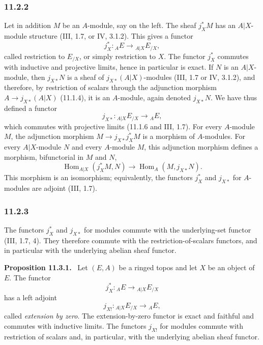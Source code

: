 \documentclass[11pt]{article}
\newcommand{\Hom}{\operatorname{Hom}}
\newenvironment{statement}[1]{\par\medskip\noindent\textbf{#1.}\ }{\par\medskip}
\begin{document}
\subsubsection*{11.2.2}
Let in addition $M$ be an $A$-module, say on the left. The sheaf $j_X^*M$ has an $A|X$-module structure (III, 1.7, or IV, 3.1.2). This gives a functor
\[
j_X^*:{}_AE\longrightarrow {}_{A|X}E_{/X},
\]
called restriction to $E_{/X}$, or simply restriction to $X$. The functor $j_X^*$ commutes with inductive and projective limits, hence in particular is exact. If $N$ is an $A|X$-module, then $j_{X*}N$ is a sheaf of $j_{X*}(A|X)$-modules (III, 1.7 or IV, 3.1.2), and therefore, by restriction of scalars through the adjunction morphism $A\to j_{X*}(A|X)$ (11.1.4), it is an $A$-module, again denoted $j_{X*}N$. We have thus defined a functor
\[
j_{X*}:{}_{A|X}E_{/X}\longrightarrow {}_AE,
\]
which commutes with projective limits (11.1.6 and III, 1.7). For every $A$-module $M$, the adjunction morphism $M\to j_{X*}j_X^*M$ is a morphism of $A$-modules. For every $A|X$-module $N$ and every $A$-module $M$, this adjunction morphism defines a morphism, bifunctorial in $M$ and $N$,
\begin{equation}
\Hom_{A|X}(j_X^*M,N)\longrightarrow \Hom_A(M,j_{X*}N).\tag{11.2.2.1}
\end{equation}
This morphism is an isomorphism; equivalently, the functors $j_X^*$ and $j_{X*}$ for $A$-modules are adjoint (III, 1.7).

\subsubsection*{11.2.3}
The functors $j_X^*$ and $j_{X*}$ for modules commute with the underlying-set functor (III, 1.7, 4). They therefore commute with the restriction-of-scalars functors, and in particular with the underlying abelian sheaf functor.

\begin{statement}{Proposition 11.3.1}
Let $(E,A)$ be a ringed topos and let $X$ be an object of $E$. The functor
\[
j_X^*:{}_AE\longrightarrow {}_{A|X}E_{/X}
\]
has a left adjoint
\[
j_{X!}:{}_{A|X}E_{/X}\longrightarrow {}_AE,
\]
called \emph{extension by zero}. The extension-by-zero functor is exact and faithful and commutes with inductive limits. The functors $j_{X!}$ for modules commute with restriction of scalars and, in particular, with the underlying abelian sheaf functor.
\end{statement}
\end{document}

